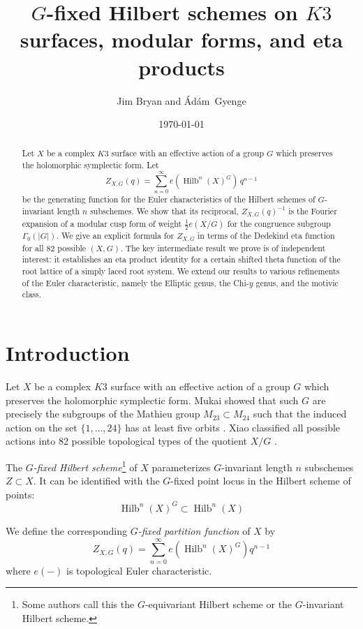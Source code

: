 \documentclass{amsart}
\title{$G$-fixed Hilbert schemes on $K3$ surfaces, modular forms, and
eta products}
\author{Jim Bryan and { \'{A}d\'{a}m~Gyenge}}
\date{\today}
\theoremstyle{definition}
\newcommand{\half}{\frac{1}{2}}
\newcommand{\Hilb}{\operatorname{Hilb}}
\begin{document}

\begin{abstract}
Let $X$ be a complex $K3$ surface with an effective action of a group
$G$ which preserves the holomorphic symplectic form. Let 
\[
Z_{X,G}(q) = \sum_{n=0}^{\infty} e\left(\Hilb^{n}(X)^{G} \right)\, q^{n-1}
\]
be the generating function for the Euler characteristics of the
Hilbert schemes of $G$-invariant length $n$ subschemes. We show that
its reciprocal, $Z_{X,G}(q)^{-1}$ is the Fourier expansion of a
modular cusp form of weight $\half e(X/G)$ for the congruence subgroup
$\Gamma_{0}(|G|)$. We give an explicit formula for $Z_{X,G}$ in terms
of the Dedekind eta function for all 82 possible $(X,G)$. The key
intermediate result we prove is of independent interest: it
establishes an eta product identity for a certain shifted theta
function of the root lattice of a simply laced root system. We extend
our results to various refinements of the Euler characteristic, namely
the Elliptic genus, the Chi-$y$ genus, and the motivic class.
\end{abstract}


\maketitle





\section{Introduction}

Let $X$ be a complex $K3$ surface with an effective action of a group
$G$ which preserves the holomorphic symplectic form. Mukai showed that
such $G$ are precisely the subgroups of the Mathieu group
$M_{23}\subset M_{24}$ such that the induced action on the set
$\{1,\dots ,24 \}$ has at least five orbits
\cite{mukai1988finite}. Xiao classified all possible actions into
82 possible topological types of the quotient $X/G$ \cite{xiao1996galois}.

The \emph{$G$-fixed Hilbert scheme}\footnote{Some authors call this
the $G$-equivariant Hilbert scheme or the $G$-invariant Hilbert
scheme.} of $X$ parameterizes $G$-invariant length $n$ subschemes
$Z\subset X$. It can be identified with the $G$-fixed point locus in
the Hilbert scheme of points:
\[
\Hilb^{n}(X)^{G} \subset \Hilb^{n}(X)
\]

We define the corresponding \emph{$G$-fixed partition function} of
$X$ by
\[
Z_{X,G}(q) = \sum_{n=0}^{\infty} e\left(\Hilb^{n}(X)^{G} \right) q^{n-1} 
\]
where $e(-)$ is topological Euler characteristic.
\end{document}
